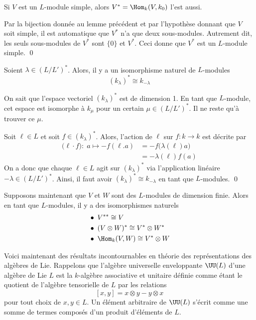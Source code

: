 \begin{Cor} \label{dualsimple} Si $V$ est un $L$-module simple, alors $V^*= \Hom_k(V,k_0)$ l'est aussi.
\begin{pre} Par la bijection donnée au lemme précédent et par l'hypothèse donnant que $V$ soit simple, il est automatique que $V^*$ n'a que deux sous-modules. Autrement dit, les seuls sous-modules de $V^*$ sont $\{0\}$ et $V^*$. Ceci donne que $V^*$ est un $L$-module simple. \qed 
\end{pre}
\end{Cor}

\begin{Lem} Soient $\lambda \in (L/L')^*$. Alors, il y a un isomorphisme naturel de $L$-modules
\begin{equation} \label{dualdimension1}
(k_\lambda)^* \cong k_{- \lambda}
\end{equation}
\begin{pre} On sait que l'espace vectoriel $(k_\lambda)^*$ est de dimension 1. En tant que $L$-module, cet espace est isomorphe à $k_\mu$ pour un certain $\mu \in (L/L')^*$. Il ne reste qu'à trouver ce $\mu$.

Soit $\ell \in L$ et soit $f \in (k_\lambda)^*$. Alors, l'action de $\ell$ sur $f : k \rightarrow k$ est décrite par
\begin{align*}
\big(\ell \cdot f\big) : \; a \mapsto - f(\ell.a) &= - f\big(\lambda(\ell)a\big)\\
&= - \lambda(\ell)f(a)
\end{align*}
On a donc que chaque $\ell \in L$ agit sur $(k_\lambda)^*$ via l'application linéaire $- \lambda \in (L/L')^*$. Ainsi, il faut avoir $(k_\lambda)^* \cong k_{- \lambda}$ en tant que $L$-modules. \qed
\end{pre}
\end{Lem}


Supposons maintenant que $V$ et $W$ sont des $L$-modules de dimension finie. Alors en tant que $L$-modules, il y a des isomorphismes naturels
\begin{align}
\label{doubledual} &\bullet \; V^{**} \cong V\\
\label{dualdistributif} &\bullet \; (V \otimes W)^* \cong V^* \otimes W^*\\
\label{homtenseur} &\bullet \; \Hom_k(V,W) \cong V^* \otimes W
\end{align}

Voici maintenant des résultats incontournables en théorie des représentations des algèbres de Lie. Rappelons que l'algèbre universelle enveloppante $\UU(L)$ d'une algèbre de Lie $L$ est la $k$-algèbre associative et unitaire définie comme étant le quotient de l'algèbre tensorielle de $L$ par les relations
$$[x,y] = x \otimes y - y \otimes x $$
pour tout choix de $x,y \in L$. Un élément arbitraire de $\UU(L)$ s'écrit comme une somme de termes composés d'un produit d'éléments de $L$.  

